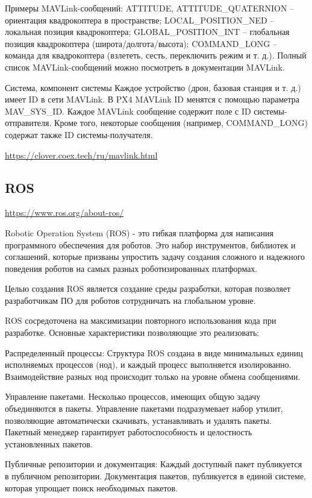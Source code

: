 Примеры MAVLink-сообщений:
ATTITUDE, ATTITUDE_QUATERNION – ориентация квадрокоптера в пространстве;
LOCAL_POSITION_NED – локальная позиция квадрокоптера;
GLOBAL_POSITION_INT – глобальная позиция квадрокоптера (широта/долгота/высота);
COMMAND_LONG – команда для квадрокоптера (взлететь, сесть, переключить режим и т. д.).
Полный список MAVLink-сообщений можно посмотреть в документации MAVLink.

Система, компонент системы
Каждое устройство (дрон, базовая станция и т. д.) имеет ID в сети MAVLink. В PX4 MAVLink ID менятся с помощью параметра MAV_SYS_ID. Каждое MAVLink сообщение содержит поле с ID системы-отправителя. Кроме того, некоторые сообщения (например, COMMAND_LONG) содержат также ID системы-получателя.

\url{https://clover.coex.tech/ru/mavlink.html}

\subsection{ROS}
\url{https://www.ros.org/about-ros/}

Robotic Operation System (ROS) - это гибкая платформа для написания программного обеспечения для роботов. Это набор инструментов, библиотек и соглашений, которые призваны упростить задачу создания сложного и надежного поведения роботов на самых разных роботизированных платформах.

Целью создания ROS является создание среды разработки, которая позволяет разработчикам ПО для роботов сотрудничать на глобальном уровне.

ROS сосредоточена на максимизации повторного использования кода при разработке. Основные характеристики позволяющие это реализовать:

Распределенный процессы: Структура ROS создана в виде минимальных единиц исполняемых процессов (нод), и каждый процесс выполняется изолированно. Взаимодействие разных нод происходит только на уровне обмена сообщениями.

Управление пакетами. Несколько процессов, имеющих общую задачу объединяются в пакеты. Управление пакетами подразумевает набор утилит, позволяющие автоматически скачивать, устанавливать и удалять пакеты. Пакетный менеджер гарантирует работоспособность и целостность установленных пакетов.

Публичные репозитории и документация: Каждый доступный пакет публикуется в публичном репозитории. Документация пакетов, публикуется в единой системе, которая упрощает поиск необходимых пакетов.

